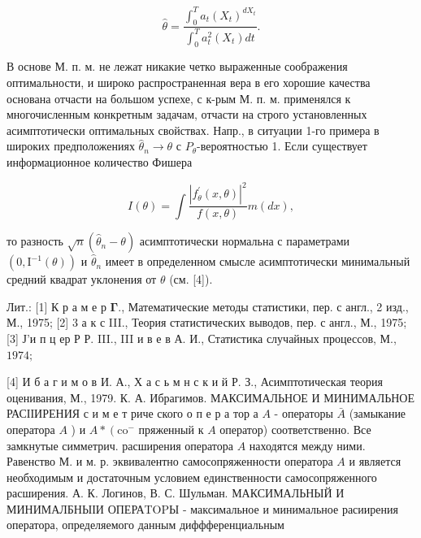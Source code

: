 \documentclass[10pt]{article}
\begin{document}
\[

\hat{\theta}=\frac{\int_{0}^{T} a_{t}\left(X_{t}\right)^{d X_{t}}}{\int_{0}^{T} a_{t}^{2}\left(X_{t}\right) d t} .

\]



В основе М. п. м. не лежат никакие четко выраженные соображения оптимальности, и широко распространенная вера в его хорошие качества основана отчасти на большом успехе, с к-рым М. п. м. применялся к многочисленным конкретным задачам, отчасти на строго установленных асимптотически оптимальных свойствах. Напр., в ситуации 1-го примера в широких предположениях $\hat{\theta}_{n} \rightarrow \theta$ с $P_{\theta}$-вероятностью 1. Если существует информационное количество Фишера



\[

I(\theta)=\int \frac{\left|f_{\theta}^{\prime}(x, \theta)\right|^{2}}{f(x, \theta)} m(d x),

\]



то разность $\sqrt{n}\left(\hat{\theta}_{n}-\theta\right)$ асимптотически нормальна с параметрами $\left(0, \mathrm{I}^{-1}(\theta)\right)$ и $\hat{\theta}_{n}$ имеет в определенном смысле асимптотически минимальный средний квадрат уклонения от $\theta$ (см. [4]).



Лит.: [1] К р а м е р $\boldsymbol{\Gamma}$., Математические методы статистики, пер. с англ., 2 изд., М., 1975; [2] 3 а к с III., Теория статистических выводов, пер. с англ., М., 1975; [3] Ј'и п ц ер Р Р. III., III и в е в А. И., Статистика случайных процессов, М., $1974 ;$

[4] И б а г и м о в И. А., Х а с ь м н с к и й Р. З., Асимптотическая теория оценивания, М., 1979. К. А. Ибрагимов. МАКСИМАЛЬНОЕ И МИНИМАЛЬНОЕ РАСІІИРЕНИЯ с и м е т риче ского о п е р а тор а $A$ - операторы $\bar{A}$ (замыкание оператора $A$ ) и $A *\left(\mathrm{co}^{-}\right.$ пряженный к $A$ оператор) соответственно. Все замкнутые симметрич. расширения оператора $A$ находятся между ними. Равенство М. и м. р. эквивалентно самосопряженности оператора $A$ и является необходимым и достаточным условием единственности самосопряженного расширения. А. К. Логинов, В. С. Шульман. МАКСИМАЛЬНЫЙ И МИНИМАЛБНЫІИ ОПЕРАTOPЫ - максимальное и минимальное расиирения оператора, определяемого данным диффференциальным
\end{document}
